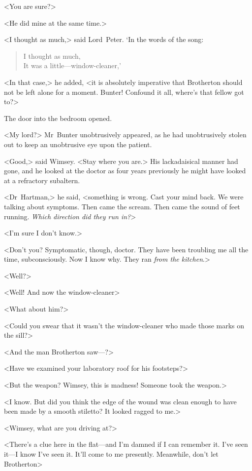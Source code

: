 <You are sure?>

<He did mine at the same time.>

<I thought as much,> said Lord~Peter. `In the words of the song:

\begin{verse}
I thought as much,\\
It was a little—window-cleaner,'
\end{verse}

<In that case,> he added, <it is absolutely imperative that Brotherton should not be left alone for a moment. Bunter! Confound it all, where's that fellow got to?>

The door into the bedroom opened.

<My lord?> Mr~Bunter unobtrusively appeared, as he had unobtrusively stolen out to keep an unobtrusive eye upon the patient.

<Good,> said Wimsey. <Stay where you are.> His lackadaisical manner had gone, and he looked at the doctor as four years previously he might have looked at a refractory subaltern.

<Dr~Hartman,> he said, <something is wrong. Cast your mind back. We were talking about symptoms. Then came the scream. Then came the sound of feet running. \textit{Which direction did they run in?}>

<I'm sure I don't know.>

<Don't you? Symptomatic, though, doctor. They have been troubling me all the time, subconsciously. Now I know why. They ran \textit{from the kitchen}.>

<Well?>

<Well! And now the window-cleaner\longdash>

<What about him?>

<Could you swear that it wasn't the window-cleaner who made those marks on the sill?>

<And the man Brotherton saw—?>

<Have we examined your laboratory roof for his footsteps?>

<But the weapon? Wimsey, this is madness! Someone took the weapon.>

<I know. But did you think the edge of the wound was clean enough to have been made by a smooth stiletto? It looked ragged to me.>

<Wimsey, what are you driving at?>

<There's a clue here in the flat—and I'm damned if I can remember it. I've seen it—I know I've seen it. It'll come to me presently. Meanwhile, don't let Brotherton\longdash>

